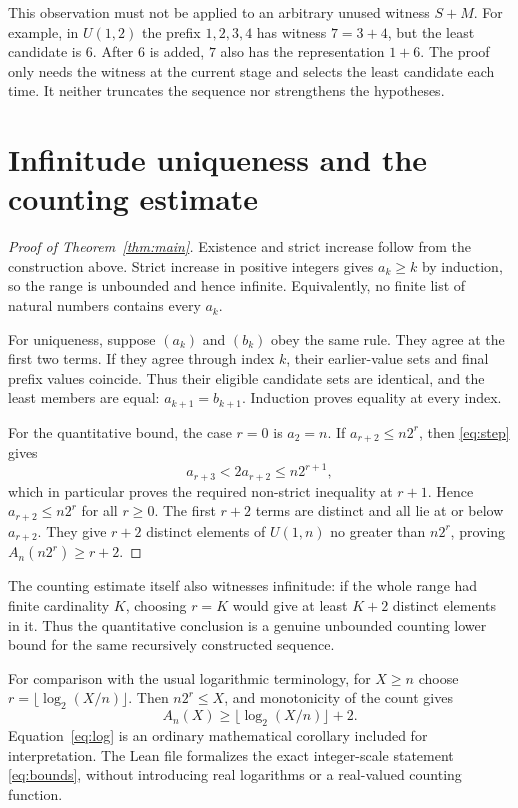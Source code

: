 \documentclass[11pt,a4paper]{article}
\begin{document}
This observation must not be applied to an arbitrary unused witness $S+M$. For example, in $U(1,2)$ the prefix $1,2,3,4$ has witness $7=3+4$, but the least candidate is $6$. After $6$ is added, $7$ also has the representation $1+6$. The proof only needs the witness at the current stage and selects the least candidate each time. It neither truncates the sequence nor strengthens the hypotheses.

\section{Infinitude uniqueness and the counting estimate}
\begin{proof}[Proof of Theorem~\ref{thm:main}]
Existence and strict increase follow from the construction above. Strict increase in positive integers gives $a_k\ge k$ by induction, so the range is unbounded and hence infinite. Equivalently, no finite list of natural numbers contains every $a_k$.

For uniqueness, suppose $(a_k)$ and $(b_k)$ obey the same rule. They agree at the first two terms. If they agree through index $k$, their earlier-value sets and final prefix values coincide. Thus their eligible candidate sets are identical, and the least members are equal: $a_{k+1}=b_{k+1}$. Induction proves equality at every index.

For the quantitative bound, the case $r=0$ is $a_2=n$. If $a_{r+2}\le n2^r$, then \eqref{eq:step} gives
\[
a_{r+3}<2a_{r+2}\le n2^{r+1},
\]
which in particular proves the required non-strict inequality at $r+1$. Hence $a_{r+2}\le n2^r$ for all $r\ge0$. The first $r+2$ terms are distinct and all lie at or below $a_{r+2}$. They give $r+2$ distinct elements of $U(1,n)$ no greater than $n2^r$, proving $A_n(n2^r)\ge r+2$.
\end{proof}

The counting estimate itself also witnesses infinitude: if the whole range had finite cardinality $K$, choosing $r=K$ would give at least $K+2$ distinct elements in it. Thus the quantitative conclusion is a genuine unbounded counting lower bound for the same recursively constructed sequence.

For comparison with the usual logarithmic terminology, for $X\ge n$ choose $r=\lfloor\log_2(X/n)\rfloor$. Then $n2^r\le X$, and monotonicity of the count gives
\begin{equation}\label{eq:log}
A_n(X)\ge\lfloor\log_2(X/n)\rfloor+2.
\end{equation}
Equation~\eqref{eq:log} is an ordinary mathematical corollary included for interpretation. The Lean file formalizes the exact integer-scale statement \eqref{eq:bounds}, without introducing real logarithms or a real-valued counting function.
\end{document}

